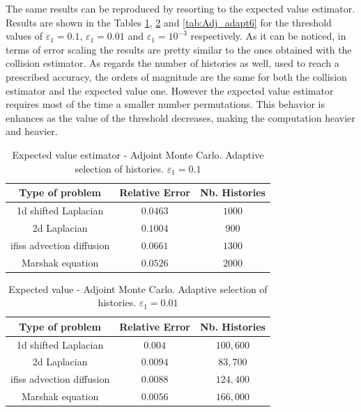\documentclass[a4paper,10pt]{article}
\begin{document}
The same results can be reproduced by resorting to the expected value
estimator. Results are shown in the Tables \ref{tab:Adj_adapt4},
\ref{tab:Adj_adapt5} and \ref{tab:Adj_adapt6} for the threshold values of
$\varepsilon_1=0.1$, $\varepsilon_1=0.01$ and $\varepsilon_1=10^{-3}$
respectively. As it can be noticed, in terms of error scaling the results are
pretty similar to the ones obtained with the collision estimator. As regards
the number of histories as well, used to reach a prescribed accuracy, the
orders of magnitude are the same for both the collision estimator and the
expected value one. However the expected value estimator requires most of the
time a smaller number permutations. This behavior is enhances as the value of
the threshold decreases, making the computation heavier and heavier.


\begin{table}[!h]
\centering
\begin{tabular}{|c|c|c|}
\hline
\textbf{Type of problem} & \textbf{Relative Error} &\textbf{Nb. Histories}\\
\hline
1d shifted Laplacian & $0.0463$ & $1000$\\
\hline
2d Laplacian & $0.1004$ & $900$\\
\hline
ifiss advection diffusion & $0.0661$  & $1300$\\
\hline
Marshak equation & $0.0526$ & $2000$\\
\hline
\end{tabular}
\caption{Expected value estimator - Adjoint Monte Carlo. Adaptive selection of
histories.
$\varepsilon_1=0.1$}
\label{tab:Adj_adapt4}
\end{table}


\begin{table}[!h]
\centering
\begin{tabular}{|c|c|c|}
\hline
\textbf{Type of problem} & \textbf{Relative Error} &\textbf{Nb. Histories}\\
\hline
1d shifted Laplacian & $0.004$ & $100,600$\\
\hline
2d Laplacian & $0.0094$ & $83,700$\\
\hline
ifiss advection diffusion & $0.0088$  & $124,400$\\
\hline
Marshak equation & $0.0056$ & $166,000$\\
\hline
\end{tabular}
\caption{Expected value - Adjoint Monte Carlo. Adaptive selection of histories.
$\varepsilon_1=0.01$}
\label{tab:Adj_adapt5}
\end{table}
\end{document}
